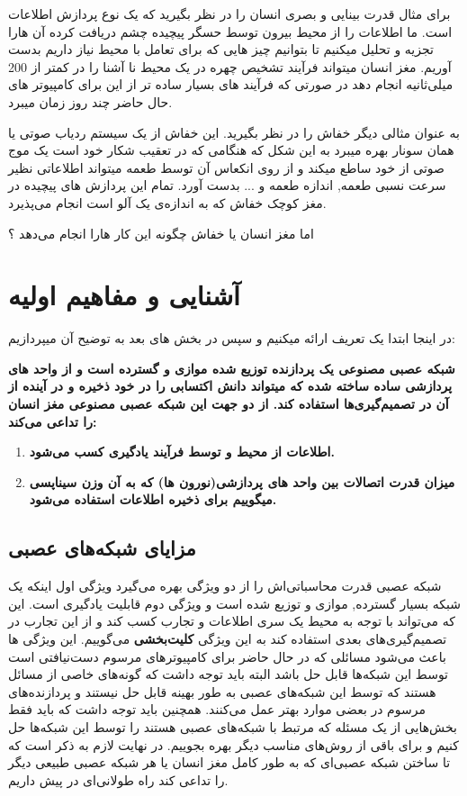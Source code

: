 \documentclass[11pt,a4paper,twocolumn]{article}
\begin{document}
برای مثال قدرت بینایی و بصری انسان را در نظر بگیرید که یک نوع پردازش اطلاعات است. ما اطلاعات را از محیط بیرون توسط حسگر پیچیده چشم دریافت کرده آن هارا تجزیه و تحلیل میکنیم تا بتوانیم چیز هایی که برای تعامل با محیط نیاز داریم بدست آوریم. مغز انسان میتواند فرآیند تشخیص چهره در یک محیط نا آشنا را در کمتر از 200 میلی‌ثانیه انجام دهد در صورتی که فرآیند های بسیار ساده تر از این برای کامپیوتر های حال حاضر چند روز زمان میبرد.

به عنوان مثالی دیگر خفاش را در نظر بگیرید. این خفاش از یک سیستم ردیاب صوتی یا همان سونار بهره میبرد به این شکل که هنگامی که در تعقیب شکار خود است یک موج صوتی از خود ساطع میکند و از روی انکعاس آن توسط طعمه میتواند اطلاعاتی نظیر  سرعت نسبی طعمه, اندازه طعمه و ... بدست آورد. تمام این پردازش های پیچیده در مغز کوچک خفاش که به اندازه‌‌ی یک آلو است انجام می‌پذیرد.

اما مغز انسان یا خفاش چگونه این کار هارا انجام می‌دهد ؟ 
\section{آشنایی و مفاهیم اولیه}
در اینجا ابتدا یک تعریف ارائه میکنیم\cite[ص-۲]{haykin}
و سپس در بخش های بعد به توضیح آن میپردازیم:

\textbf{ شبکه عصبی مصنوعی یک پردازنده توزیع شده موازی و گسترده است و از واحد های پردازشی ساده ساخته شده که میتواند دانش اکتسابی را در خود ذخیره و در آینده از آن در تصمیم‌گیری‌ها استفاده کند. از دو جهت این شبکه عصبی مصنوعی  مغز انسان  را تداعی می‌کند:
}
\begin{enumerate}
\item 
\textbf{اطلاعات از محیط و توسط فرآیند یادگیری کسب می‌شود.}
 
\item
\textbf{میزان قدرت اتصالات بین واحد های پردازشی(نورون ها) که به آن وزن سیناپسی میگوییم برای ذخیره اطلاعات استفاده می‌شود.}
\end{enumerate}

\subsection{مزایای شبکه‌های عصبی}
شبکه عصبی قدرت محاسباتی‌اش را از دو ویژگی بهره می‌گیرد ویژگی اول اینکه یک شبکه بسیار گسترده, موازی و توزیع شده است و ویژگی دوم قابلیت یادگیری است. این که می‌تواند با توجه به محیط یک سری اطلاعات و تجارب کسب کند و از این تجارب در تصمیم‌گیری‌های بعدی استفاده کند به این ویژگی
\textbf{کلیت‌بخشی}
می‌گوییم. این ویژگی ها باعث می‌شود  مسائلی که در حال حاضر برای کامپیوتر‌های مرسوم دست‌نیافتی است توسط این شبکه‌ها قابل حل باشد البته باید توجه داشت که گونه‌های خاصی از مسائل هستند که توسط این شبکه‌های عصبی به طور بهینه قابل حل نیستند و پردازنده‌های مرسوم در بعضی موارد بهتر عمل می‌کنند. همچنین باید توجه داشت که باید فقط بخش‌هایی از یک مسئله که مرتبط با شبکه‌های عصبی هستند را توسط این شبکه‌ها حل کنیم و برای باقی از روش‌های مناسب دیگر بهره بجوییم. در نهایت لازم به ذکر است که تا ساختن شبکه عصبی‌ای که به طور کامل مغز انسان یا هر شبکه عصبی طبیعی دیگر را تداعی کند راه طولانی‌ای در پیش داریم.
\end{document}
